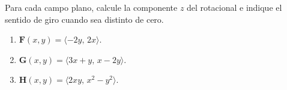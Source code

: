 Para cada campo plano, calcule la componente $z$ del rotacional e indique el sentido de giro cuando sea distinto de cero.
\begin{enumerate}
    \item $\mathbf{F}(x,y)=\langle -2y,\,2x\rangle$.
    \item $\mathbf{G}(x,y)=\langle 3x+y,\,x-2y\rangle$.
    \item $\mathbf{H}(x,y)=\langle 2xy,\,x^2-y^2\rangle$.
\end{enumerate}
